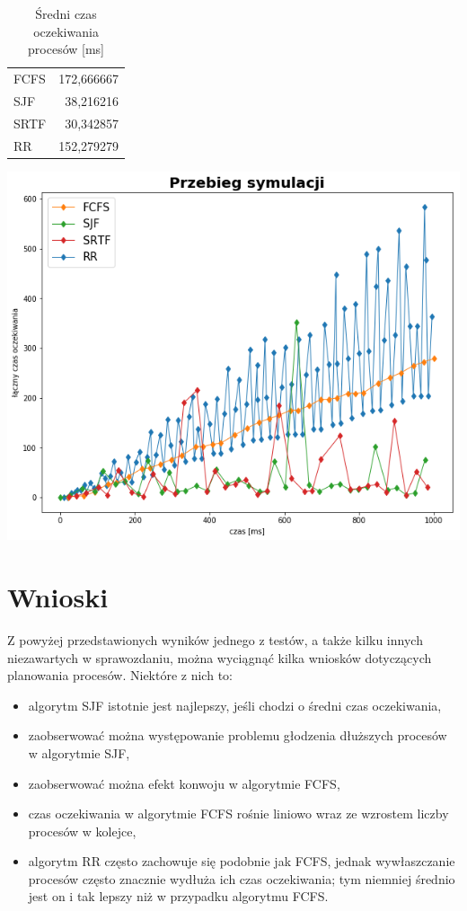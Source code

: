 \documentclass{article}
\begin{document}
\begin{table}[h]
    \centering
    \begin{tabular}{|l|r|}
        \hline
        FCFS & 172,666667 \\
        SJF  & 38,216216 \\
        SRTF & 30,342857 \\
        RR   & 152,279279 \\
        \hline
    \end{tabular}
    \caption{Średni czas oczekiwania procesów [ms]}
    \label{tab:test1czas}
\end{table}

\includegraphics[scale=0.5]{plot}

\section{Wnioski}

Z powyżej przedstawionych wyników jednego z testów, a także kilku innych niezawartych w sprawozdaniu, można wyciągnąć kilka wniosków dotyczących planowania procesów. Niektóre z nich to:

\begin{itemize}
    \item algorytm SJF istotnie jest najlepszy, jeśli chodzi o średni czas oczekiwania,
    \item zaobserwować można występowanie problemu głodzenia dłuższych procesów w algorytmie SJF,
    \item zaobserwować można efekt konwoju w algorytmie FCFS,
    \item czas oczekiwania w algorytmie FCFS rośnie liniowo wraz ze wzrostem liczby procesów w kolejce,
    \item algorytm RR często zachowuje się podobnie jak FCFS, jednak wywłaszczanie procesów często znacznie wydłuża ich czas oczekiwania; tym niemniej średnio jest on i tak lepszy niż w przypadku algorytmu FCFS.
\end{itemize}
\end{document}
